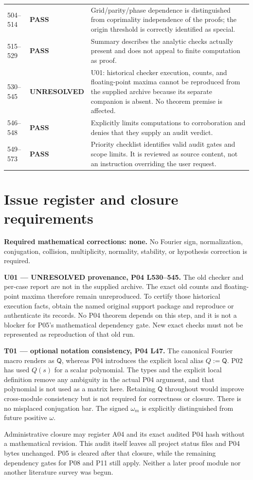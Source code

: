 \documentclass[11pt]{article}
\newcommand{\lin}[1]{\textbf{L#1}}
\begin{document}
{\begin{longtable}{L{0.10\textwidth}L{0.17\textwidth}L{0.64\textwidth}}
504--514 & \textbf{PASS} & Grid/parity/phase dependence is distinguished from coprimality independence of the proofs; the origin threshold is correctly identified as special.\\
515--529 & \textbf{PASS} & Summary describes the analytic checks actually present and does not appeal to finite computation as proof.\\
530--545 & \textbf{UNRESOLVED} & U01: historical checker execution, counts, and floating-point maxima cannot be reproduced from the supplied archive because its separate companion is absent. No theorem premise is affected.\\
546--548 & \textbf{PASS} & Explicitly limits computations to corroboration and denies that they supply an audit verdict.\\
549--573 & \textbf{PASS} & Priority checklist identifies valid audit gates and scope limits. It is reviewed as source content, not an instruction overriding the user request.\\
\bottomrule
\end{longtable}
}

\section{Issue register and closure requirements}
\textbf{Required mathematical corrections: none.}
No Fourier sign, normalization, conjugation, collision, multiplicity,
normality, stability, or hypothesis correction is required.

\textbf{U01 --- UNRESOLVED provenance, P04 \lin{530--545}.}
The old checker and per-case report are not in the supplied archive.
The exact old counts and floating-point maxima therefore remain
unreproduced. To certify those historical execution facts, obtain the
named original support package and reproduce or authenticate its records.
No P04 theorem depends on this step, and it is not a blocker for P05's
mathematical dependency gate. New exact checks must not be represented
as reproduction of that old run.

\textbf{T01 --- optional notation consistency, P04 \lin{47}.}
The canonical Fourier macro renders as $\mathsf Q$, whereas P04 introduces
the explicit local alias $Q:=\mathsf Q$. P02 has used $Q(s)$ for a scalar
polynomial. The types and the explicit local definition remove any ambiguity
in the actual P04 argument, and that polynomial is not used as a matrix
here. Retaining $\mathsf Q$ throughout would improve cross-module consistency
but is not required for correctness or closure. There is no misplaced
conjugation bar. The signed $\omega_m$ is explicitly distinguished from
future positive $\omega$.

Administrative closure may register A04 and its exact audited P04 hash
without a mathematical revision. This audit itself leaves all project
status files and P04 bytes unchanged. P05 is cleared after that closure,
while the remaining dependency gates for P08 and P11 still apply.
Neither a later proof module nor another literature survey was begun.
\end{document}
